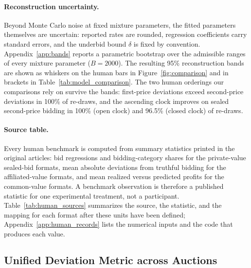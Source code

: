\documentclass[acmsmall,screen,review]{acmart}
\newcommand{\rev}[1]{{\color{blue}#1}}
\newenvironment{revblock}{\color{blue}}{}
\newcommand{\rev}[1]{#1}
\newenvironment{revblock}{}{}
\begin{document}
\paragraph{Reconstruction uncertainty.}
Beyond Monte Carlo noise at fixed mixture parameters, the fitted parameters themselves are uncertain: reported rates are rounded, regression coefficients carry standard errors, and the underbid bound $\delta$ is fixed by convention. Appendix~\ref{app:bands} reports a parametric bootstrap over the admissible ranges of every mixture parameter ($B=2000$). The resulting 95\% reconstruction bands are shown as whiskers on the human bars in Figure~\ref{fig:comparison} and in brackets in Table~\ref{tab:model_comparison}. The two human orderings our comparisons rely on survive the bands: first-price deviations exceed second-price deviations in 100\% of re-draws, and the ascending clock improves on sealed second-price bidding in 100\% (open clock) and \rev{96.5\%} (closed clock) of re-draws.


\begin{revblock}
\paragraph{Source table.}
Every human benchmark is computed from summary statistics printed in the original articles: bid regressions and bidding-category shares for the private-value sealed-bid formats, mean absolute deviations from truthful bidding for the affiliated-value formats, and mean realized versus predicted profits for the common-value formats. A benchmark observation is therefore a published statistic for one experimental treatment, not a participant. Table~\ref{tab:human_sources} summarizes the source, the statistic, and the mapping for each format after these units have been defined; Appendix~\ref{app:human_records} lists the numerical inputs and the code that produces each value.
\end{revblock}



\subsection{\texorpdfstring{Unified Deviation Metric across Auctions}{Unified Deviation Metric across Auctions}}\label{sec:method}
\end{document}
